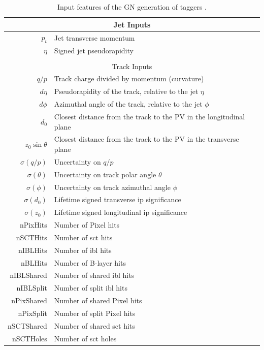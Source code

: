 \begin{table}[h]
  \begin{center}
      \begin{tabular}{rl} 
      	 \hline \hline
          \multicolumn{2}{c}{Jet Inputs}\\ \hline
          $p_t$   & Jet transverse momentum \\ 
          $\eta$  & Signed jet pseudorapidity \\ \hline \\
          \multicolumn{2}{c}{Track Inputs}\\ \hline
          $q/p$             & Track charge divided by momentum (curvature)  \\
          $d\eta$           & Pseudorapidity of the track, relative to the jet $\eta$ \\
          $d\phi$           & Azimuthal angle of the track, relative to the jet $\phi$ \\
          $d_0$             & Closest distance from the track to the PV in the longitudinal plane  \\
          $z_0 \sin\theta$  & Closest distance from the track to the PV in the transverse plane  \\
          $\sigma(q/p)$     & Uncertainty on $q/p$ \\
          $\sigma(\theta)$  & Uncertainty on track polar angle $\theta$ \\
          $\sigma(\phi)$    & Uncertainty on track azimuthal angle $\phi$ \\
          $\sigma(d_0)$     & Lifetime signed transverse \gls{ip} significance \\
          $\sigma(z_0)$     & Lifetime signed longitudinal \gls{ip} significance \\
          nPixHits          & Number of Pixel hits \\
          nSCTHits          & Number of \gls{sct} hits \\
          nIBLHits          & Number of \gls{ibl} hits \\
          nBLHits           & Number of B-layer hits \\
          nIBLShared        & Number of shared \gls{ibl} hits \\
          nIBLSplit         & Number of split \gls{ibl} hits \\
          nPixShared        & Number of shared Pixel hits \\
          nPixSplit         & Number of split Pixel hits \\
          nSCTShared        & Number of shared \gls{sct} hits \\
          nSCTHoles         & Number of \gls{sct} holes \\ \hline \hline
      \end{tabular}
    \caption{Input features of the GN generation of taggers \cite{ATL-PHYS-PUB-2022-027}.}
    \label{tab:gnInputVariables}
  \end{center}
\end{table}


